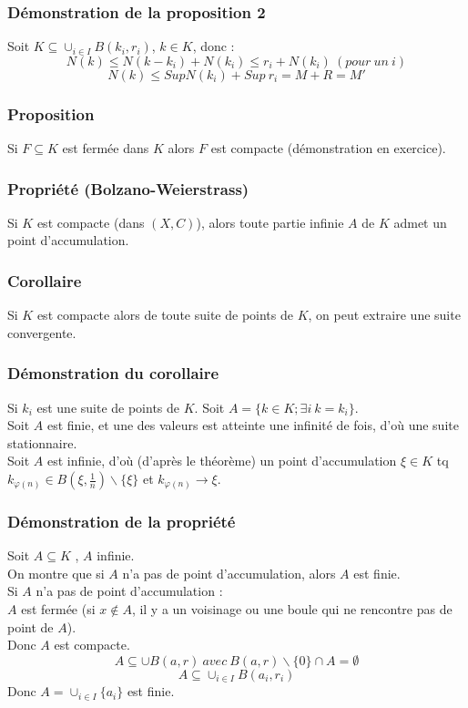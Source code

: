 \documentclass[a4paper, oneside]{report}
\newcommand{\fracun}[1]{\frac{1}{#1}}
\begin{document}
\subsubsection{Démonstration de la proposition 2}
Soit $K\subseteq \cup_{i\in I} B(k_i,r_i)$, $k\in K$, donc :
$$N(k) \leq N(k-k_i)+N(k_i) \leq r_i+N(k_i)~(pour~un~i)$$
$$N(k) \leq Sup N(k_i) + Sup~r_i = M+R=M'$$

\subsubsection{Proposition}
Si $F \subseteq K$ est fermée dans $K$ alors $F$ est compacte (démonstration en exercice).

\subsubsection{Propriété (Bolzano-Weierstrass)}
Si $K$ est compacte (dans $(X,C)$), alors toute partie infinie $A$ de $K$ admet un point d'accumulation.

\subsubsection{Corollaire}
Si $K$ est compacte alors de toute suite de points de $K$, on peut extraire une suite convergente.

\subsubsection{Démonstration du corollaire}
Si $k_i$ est une suite de points de $K$. Soit $A=\{k\in K;\exists i~k=k_i \}$.\\
Soit $A$ est finie, et une des valeurs est atteinte une infinité de fois, d'où une suite stationnaire.\\
Soit $A$ est infinie, d'où (d'après le théorème) un point d'accumulation $\xi \in K$ tq $k_{\varphi(n)}\in B(\xi, \fracun{n})\backslash \{\xi\}$ et $k_{\varphi(n)} \rightarrow \xi$.\\

\subsubsection{Démonstration de la propriété}
Soit $A\subseteq K$ , $A$ infinie.\\
On montre que si $A$ n'a pas de point d'accumulation, alors $A$ est finie.\\
Si $A$ n'a pas de point d'accumulation :\\
$A$ est fermée (si $x\notin A$, il y a un voisinage ou une boule qui ne rencontre pas de point de $A$).\\
Donc $A$ est compacte.
$$A\subseteq \cup B(a,r)~avec~B(a,r)\backslash \{0\} \cap A = \emptyset$$
$$A\subseteq \cup_{i\in I} B(a_i,r_i)$$
Donc $A=\cup_{i\in I}\{a_i\}$ est finie.
\end{document}
